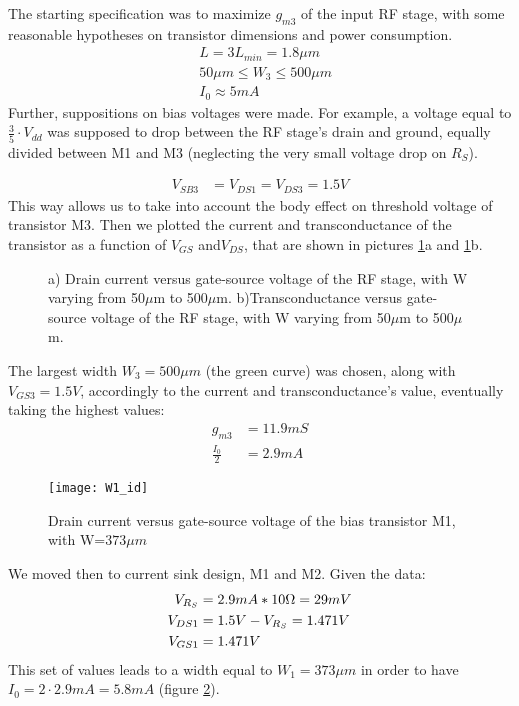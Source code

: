 The starting specification was to maximize \(g_{m3}\) of the input RF stage, with some reasonable hypotheses on transistor dimensions and power consumption. 
\begin{align}
	&L=3 L_{min} = 1.8\mu m \nonumber\\
	&50 \mu m \le W_3 \le 500 \mu m \nonumber \\
	&I_0 \approx 5mA \nonumber 
\end{align}
Further, suppositions on bias voltages were made. For example, a voltage equal to \(\frac{3}{5}\cdot V_{dd}\) was supposed to drop between the RF stage's drain and ground, equally divided between M1 and M3 (neglecting the very small voltage drop on \(R_S\)). 

\begin{align}
	V_{SB3} &= V_{DS1} = V_{DS3} = 1.5 V \nonumber 
\end{align}
This way allows us to take into account the body effect on threshold voltage of transistor M3.
Then we plotted the current and transconductance of the transistor as a function of \(V_{GS}\) and\(V_{DS}\), that are shown in pictures \ref{fig:W_2_id_gm}a and \ref{fig:W_2_id_gm}b.
\begin{figure}[H] 
	\centering
	\subfloat[][\emph{}]{\texttt{[image: W2\_id]}} \quad
	\subfloat[][\emph{}]{\texttt{[image: W2\_gm]}}
	\caption{ a) Drain current versus gate-source voltage of the RF stage, with W varying from 50\(\mu\)m to 500\(\mu\)m. b)Transconductance versus gate-source voltage of the RF stage, with W varying from 50\(\mu\)m to 500\(\mu\)m.}
	\label{fig:W_2_id_gm}
\end{figure}
The largest width  \(W_3=500\mu m\) (the green curve) was chosen, along with \(V_{GS3}=1.5V\), accordingly to the current and transconductance's value, eventually taking the highest values:
\begin{align}
	g_{m3}&=11.9mS \nonumber \\
	\frac{I_0}{2}&=2.9mA \nonumber
\end{align}
\begin{figure}[H]
	\centering
	\texttt{[image: W1\_id]}
	\caption{Drain current versus gate-source voltage of the bias transistor M1, with W=\(373\mu m\)}
	\label{W1_id}
\end{figure}
We moved then to current sink design, M1 and M2. Given the data:
\begin{align}
	V_{R_S} &= 2.9mA*10\ohm=29mV \notag \\
	V_{DS1}&=1.5V-V_{R_S}=1.471V \notag \\
	V_{GS1}&=1.471V \notag
\end{align}
This set of values leads to a width equal to \(W_1=373\mu m\) in order to have \(I_0=2\cdot2.9mA=5.8mA\) (figure \ref{W1_id}).

